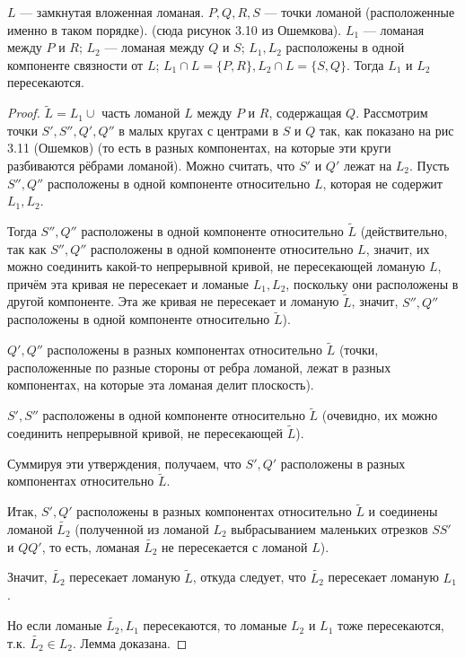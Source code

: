 \begin{lemma}
    $L$ — замкнутая вложенная ломаная. $P, Q, R, S$ — точки ломаной (расположенные именно в таком порядке). (сюда рисунок 3.10 из Ошемкова). $L_1$ — ломаная между $P$ и $R$; $L_2$ — ломаная между $Q$ и $S$; $L_1, L_2$ расположены в одной компоненте связности от $L$; $L_1 \cap L = \{P,R\}, L_2 \cap L = \{S,Q\}$. Тогда $L_1$ и $L_2$ пересекаются.
\end{lemma}
\begin{proof}
    $\tilde{L} = L_1 \cup$ часть ломаной $L$ между $P$ и $R$, содержащая $Q$.
    Рассмотрим точки $S', S'', Q', Q''$ в малых кругах с центрами в $S$ и $Q$ так, как показано на рис 3.11 (Ошемков) (то есть в разных компонентах, на которые эти круги разбиваются рёбрами ломаной).
    Можно считать, что $S'$ и $Q'$ лежат на $L_2$. Пусть $S'', Q''$ расположены в одной компоненте относительно $L$, которая не содержит $L_1, L_2$.

    Тогда $S'', Q''$ расположены в одной компоненте относительно $\tilde{L}$ (действительно, так как $S'', Q''$ расположены в одной компоненте относительно $L$, значит, их можно соединить какой-то непрерывной кривой, не пересекающей ломаную $L$, причём эта кривая не пересекает и ломаные $L_1, L_2$, поскольку они расположены в другой компоненте. Эта же кривая не пересекает и ломаную $\tilde{L}$, значит, $S'', Q''$ расположены в одной компоненте относительно $\tilde{L}$).

    $Q', Q''$ расположены в разных компонентах относительно $\tilde{L}$ (точки, расположенные по разные стороны от ребра ломаной, лежат в разных компонентах, на которые эта ломаная делит плоскость).

    $S', S''$ расположены в одной компоненте относительно $\tilde{L}$ (очевидно, их можно соединить непрерывной кривой, не пересекающей $\tilde{L}$).

    Суммируя эти утверждения, получаем, что $S', Q'$ расположены в разных компонентах относительно $\tilde{L}$.

    Итак, $S', Q'$ расположены в разных компонентах относительно $\tilde{L}$ и соединены ломаной $\tilde{L_2}$ (полученной из ломаной $L_2$ выбрасыванием маленьких отрезков $SS'$ и $QQ'$, то есть, ломаная $\tilde{L_2}$ не пересекается с ломаной $L$).

    Значит, $\tilde{L_2}$ пересекает ломаную $\tilde{L}$, откуда следует, что $\tilde{L_2}$ пересекает ломаную $L_1$. 

    Но если ломаные $\tilde{L_2}, L_1$ пересекаются, то ломаные $L_2$ и $L_1$ тоже пересекаются, т.к. $\tilde{L_2} \in L_2$. Лемма доказана.
\end{proof}

